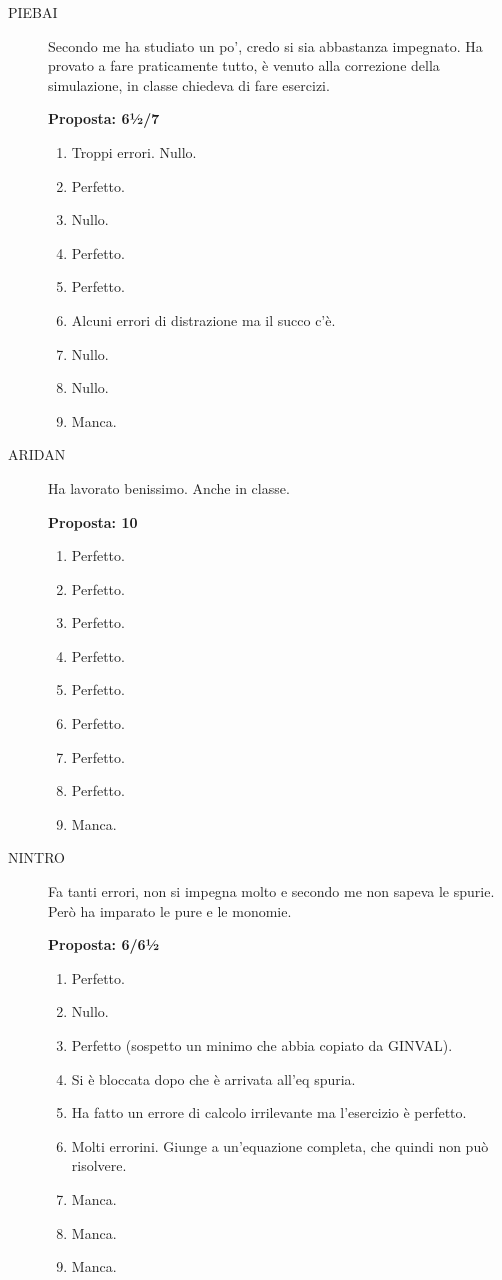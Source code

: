 \documentclass[11pt]{report}
\begin{document}
\begin{description}
\item[PIEBAI] Secondo me ha studiato un po', credo si sia abbastanza impegnato. Ha provato a fare praticamente tutto, è venuto alla correzione della simulazione, in classe chiedeva di fare esercizi.

\textbf{Proposta: 6½/7}
\begin{enumerate}
    \item Troppi errori. Nullo.
    \item Perfetto.
    \item Nullo.
    \item Perfetto.
    \item Perfetto.
    \item Alcuni errori di distrazione ma il succo c'è.
    \item Nullo.
    \item Nullo.
    \item Manca.
\end{enumerate}
\item[ARIDAN] Ha lavorato benissimo. Anche in classe.

\textbf{Proposta: 10}
\begin{enumerate}
    \item Perfetto.
    \item Perfetto.
    \item Perfetto.
    \item Perfetto.
    \item Perfetto.
    \item Perfetto.
    \item Perfetto.
    \item Perfetto.
    \item Manca.
\end{enumerate}

\item[NINTRO] Fa tanti errori, non si impegna molto e secondo me non sapeva le spurie. Però ha imparato le pure e le monomie.

\textbf{Proposta: 6/6½}
\begin{enumerate}
    \item Perfetto.
    \item Nullo.
    \item Perfetto (sospetto un minimo che abbia copiato da GINVAL).
    \item Si è bloccata dopo che è arrivata all'eq spuria.
    \item Ha fatto un errore di calcolo irrilevante ma l'esercizio è perfetto.
    \item Molti errorini. Giunge a un'equazione completa, che quindi non può risolvere.
    \item Manca.
    \item Manca. 
    \item Manca.
\end{enumerate}


\end{description}
\end{document}
